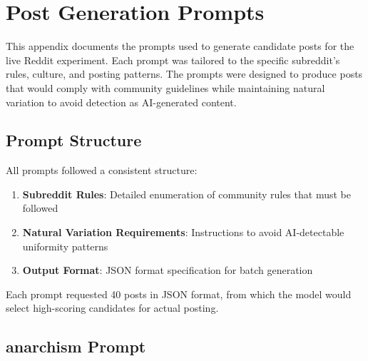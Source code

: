 \chapter{Post Generation Prompts}
\label{app:prompts}

This appendix documents the prompts used to generate candidate posts for the live Reddit experiment. Each prompt was tailored to the specific subreddit's rules, culture, and posting patterns. The prompts were designed to produce posts that would comply with community guidelines while maintaining natural variation to avoid detection as AI-generated content.

\section{Prompt Structure}

All prompts followed a consistent structure:
\begin{enumerate}
    \item \textbf{Subreddit Rules}: Detailed enumeration of community rules that must be followed
    \item \textbf{Natural Variation Requirements}: Instructions to avoid AI-detectable uniformity patterns
    \item \textbf{Output Format}: JSON format specification for batch generation
\end{enumerate}

Each prompt requested 40 posts in JSON format, from which the model would select high-scoring candidates for actual posting.

\section{anarchism Prompt}

